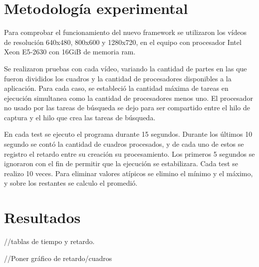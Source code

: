
\section{Metodología experimental}

Para comprobar el funcionamiento del nuevo framework se utilizaron los vídeos de
resolución 640x480, 800x600 y 1280x720, en el equipo con procesador Intel Xeon
E5-2630 con 16GiB de memoria ram.

Se realizaron pruebas con cada vídeo, variando la cantidad de partes en las que
fueron divididos los cuadros y la cantidad de procesadores disponibles a la
aplicación. Para cada caso, se estableció la cantidad máxima de tareas en
ejecución simultanea como la cantidad de procesadores menos uno. El procesador
no usado por las tareas de búsqueda se dejo para ser compartido entre el hilo
de captura y el hilo que crea las tareas de búsqueda.

En cada test se ejecuto el programa durante 15 segundos. Durante los
últimos 10 segundo se contó la cantidad de cuadros procesados, y de cada uno de
estos se registro el retardo entre su creación su procesamiento. Los primeros 5
segundos se ignoraron con el fin de permitir que la ejecución se estabilizara.
Cada test se realizo 10 veces. Para eliminar valores atípicos se elimino el
mínimo y el máximo, y sobre los restantes se calculo el promedió.

\section{Resultados}

//tablas de tiempo y retardo.

//Poner gráfico de retardo/cuadros
